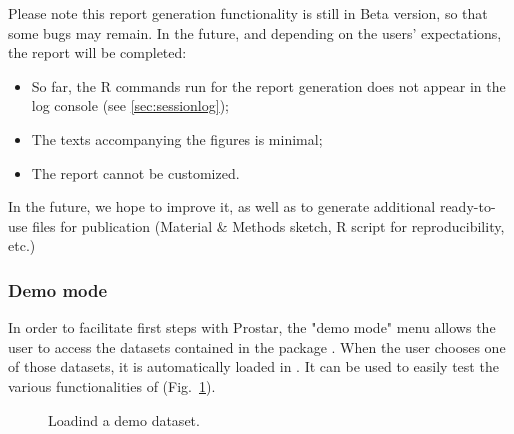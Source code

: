 \documentclass[12pt]{article}
\begin{document}
{Please note this report generation functionality is still in Beta version, so that some bugs may remain. In the future, and depending on the users' expectations, the report will be completed: 
\begin{itemize}
\item So far, the R commands run for the report generation does not appear in the log console (see \ref{sec:sessionlog});
\item The texts accompanying the figures is minimal;
\item The report cannot be customized.
\end{itemize}
In the future, we hope to improve it, as well as to generate additional ready-to-use files for  publication (Material \& Methods sketch, R script for reproducibility, etc.)

\subsubsection{Demo mode} \label{sec:demomode}

In order to facilitate first steps with Prostar, the "demo mode" menu allows 
the user to access the datasets contained in the package . 
When the user chooses one of those datasets, it is automatically loaded in 
. It can be used to easily test the various functionalities of
 (Fig.~\ref{fig:demomodeFig}).



\begin {figure}
\centering
{}
\caption{Loadind a demo dataset.}\label{fig:demomodeFig}
\end {figure}

}
\end{document}
